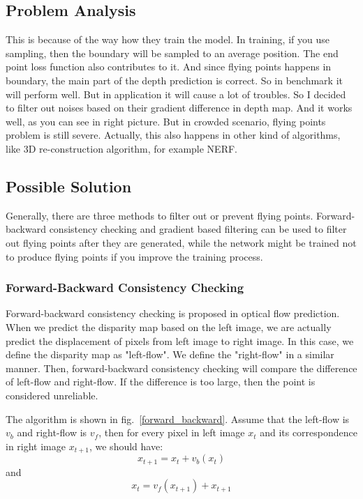 \documentclass[12pt]{article}
\begin{document}
\subsection{Problem Analysis}
This is because of the way how they train the model. In training, if you use sampling, then the boundary will be sampled to an average position. The end point loss function also contributes to it. And since flying points happens in boundary, the main part of the depth prediction is correct. So in benchmark it will perform well. But in application it will cause a lot of troubles. So I decided to filter out noises based on their gradient difference in depth map. And it works well, as you can see in right picture. But in crowded scenario, flying points problem is still severe.
Actually, this also happens in other kind of algorithms, like 3D re-construction algorithm, for example NERF. 
\subsection{Possible Solution}
Generally, there are three methods to filter out or prevent flying points. Forward-backward consistency checking and gradient based filtering can be used to filter out flying points after they are generated, while the network might be trained not to produce flying points if you improve the training process.
\subsubsection{Forward-Backward Consistency Checking}
Forward-backward consistency checking is proposed in optical flow prediction. When we predict the disparity map based on the left image, we are actually predict the displacement of pixels from left image to right image. In this case, we define the disparity map as "left-flow". We define the "right-flow" in a similar manner. Then, forward-backward consistency checking will compare the difference of left-flow and right-flow. If the difference is too large, then the point is considered unreliable.

The algorithm is shown in fig.~\ref{forward_backward}. Assume that the left-flow is $v_b$ and right-flow is $v_f$, then for every pixel in left image $x_t$ and its correspondence in right image $x_{t+1}$,  we should have:$$x_{t+1}=x_t+v_b(x_t)$$ and $$x_t=v_f(x_{t+1})+x_{t+1}$$
\end{document}
